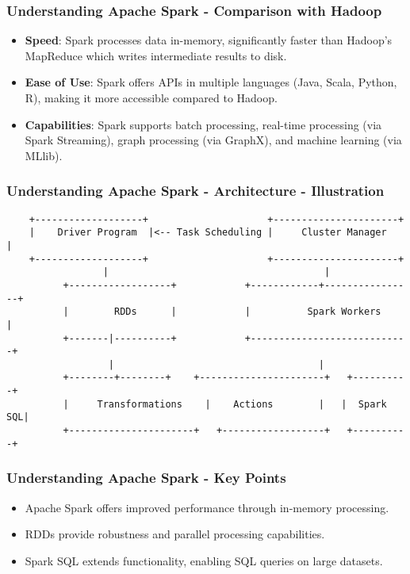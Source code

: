 \documentclass{beamer}
\begin{document}
\begin{frame}[fragile]
    \frametitle{Understanding Apache Spark - Comparison with Hadoop}
    \begin{itemize}
        \item \textbf{Speed}: 
        Spark processes data in-memory, significantly faster than Hadoop's MapReduce which writes intermediate results to disk.
        
        \item \textbf{Ease of Use}:
        Spark offers APIs in multiple languages (Java, Scala, Python, R), making it more accessible compared to Hadoop.

        \item \textbf{Capabilities}:
        Spark supports batch processing, real-time processing (via Spark Streaming), graph processing (via GraphX), and machine learning (via MLlib).
    \end{itemize}
\end{frame}

\begin{frame}[fragile]
    \frametitle{Understanding Apache Spark - Architecture - Illustration}
    \begin{verbatim}
    +-------------------+                     +----------------------+
    |    Driver Program  |<-- Task Scheduling |     Cluster Manager    |
    +-------------------+                     +----------------------+
                 |                                      |
          +------------------+            +------------+----------------+
          |        RDDs      |            |          Spark Workers     |
          +-------|----------+            +----------------------------+
                  |                                    |
          +--------+--------+    +----------------------+   +----------+
          |     Transformations    |    Actions        |   |  Spark SQL|
          +----------------------+   +------------------+   +----------+
    \end{verbatim}
\end{frame}

\begin{frame}[fragile]
    \frametitle{Understanding Apache Spark - Key Points}
    \begin{itemize}
        \item Apache Spark offers improved performance through in-memory processing.
        \item RDDs provide robustness and parallel processing capabilities.
        \item Spark SQL extends functionality, enabling SQL queries on large datasets.
    \end{itemize}
\end{frame}
\end{document}
